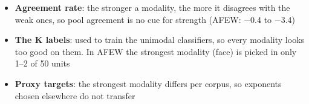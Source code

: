 \begin{frame}{}
{\begin{itemize}
\end{itemize}
}{%
\begin{itemize}
\item \textbf{Agreement rate}: the stronger a modality, the more it disagrees with the weak ones, so pool agreement is no cue for strength (AFEW: −0.4 to −3.4)
\item \textbf{The K labels}: used to train the unimodal classifiers, so every modality looks too good on them. In AFEW the strongest modality (face) is picked in only 1--2 of 50 units
\item \textbf{Proxy targets}: the strongest modality differs per corpus, so exponents chosen elsewhere do not transfer
\end{itemize}
}
\end{frame}

